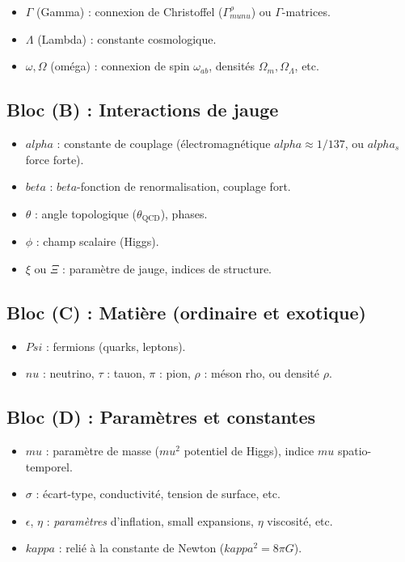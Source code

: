 \documentclass[12pt]{article}
\def\Psi{Psi}%
\def\kappa{kappa}%
\def\mu{mu}%
\def\nu{nu}%
\def\alpha{alpha}%
\def\beta{beta}%
\begin{document}
\begin{itemize}
    \item \(\Gamma\) (Gamma) : connexion de Christoffel (\(\Gamma^\rho_{\mu\nu}\)) ou \(\Gamma\)-matrices.
    \item \(\Lambda\) (Lambda) : constante cosmologique.
    \item \(\omega,\Omega\) (oméga) : connexion de spin \(\omega_{ab}\), densités \(\Omega_m, \Omega_\Lambda\), etc.
\end{itemize}

\subsection{Bloc (B) : Interactions de jauge}

\begin{itemize}
    \item \(\alpha\) : constante de couplage (électromagnétique \(\alpha\approx1/137\), ou \(\alpha_s\) force forte).
    \item \(\beta\) : \(\beta\)-fonction de renormalisation, couplage fort. 
    \item \(\theta\) : angle topologique (\(\theta_{\mathrm{QCD}}\)), phases.
    \item \(\phi\) : champ scalaire (Higgs).
    \item \(\xi\) ou \(\Xi\) : paramètre de jauge, indices de structure.
\end{itemize}

\subsection{Bloc (C) : Matière (ordinaire et exotique)}

\begin{itemize}
    \item \(\Psi\) : fermions (quarks, leptons). 
    \item \(\nu\) : neutrino, 
    \(\tau\) : tauon,
    \(\pi\) : pion,
    \(\rho\) : méson rho, ou densité \(\rho\).
\end{itemize}

\subsection{Bloc (D) : Paramètres et constantes}

\begin{itemize}
    \item \(\mu\) : paramètre de masse (\(\mu^2\) potentiel de Higgs), indice \(\mu\) spatio-temporel.
    \item \(\sigma\) : écart-type, conductivité, tension de surface, etc.
    \item \(\epsilon\), \(\eta\) : \emph{paramètres} d'inflation, small expansions, \(\eta\) viscosité, etc.
    \item \(\kappa\) : relié à la constante de Newton (\(\kappa^2=8\pi G\)).
\end{itemize}
\end{document}
